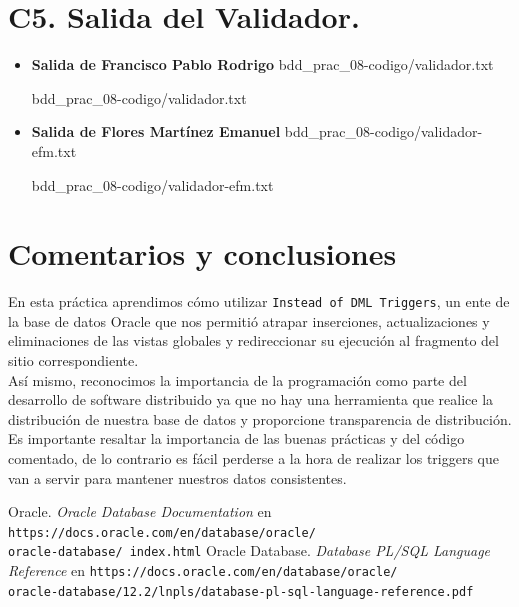 \documentclass{article}
\newcommand{\codedir}{bdd_prac_08-codigo}
\begin{document}
\section*{C5. Salida del Validador.}

\begin{itemize}
  \item \textbf{Salida de Francisco Pablo Rodrigo}
     {\codedir/validador.txt}
    
    {\codedir/validador.txt}

  \item \textbf{Salida de Flores Martínez Emanuel}
     {\codedir/validador-efm.txt}
    
    {\codedir/validador-efm.txt}
\end{itemize}

\newpage
\section*{Comentarios y conclusiones}

En esta práctica aprendimos cómo utilizar \texttt{Instead of DML Triggers},
un ente de la base de datos Oracle que nos permitió atrapar inserciones,
actualizaciones y eliminaciones de las vistas globales y redireccionar su
ejecución al fragmento del sitio correspondiente.\\

Así mismo, reconocimos la importancia de la programación como parte del
desarrollo de software distribuido ya que no hay una herramienta que realice la
distribución de nuestra base de datos y proporcione transparencia de
distribución. Es importante resaltar la importancia de las buenas prácticas y
del código comentado, de lo contrario es fácil perderse a la hora de realizar
los triggers que van a servir para mantener nuestros datos consistentes.

\renewcommand\refname{Bibliografía}
\begin{thebibliography}{99}
     Oracle. \textit{Oracle Database Documentation} en 
        \texttt{https://docs.oracle.com/en/database/oracle/\\oracle-database/%
        index.html}
     Oracle Database. \textit{Database PL/SQL Language 
        Reference} en 
        \texttt{https://docs.oracle.com/en/database/oracle/\\
        oracle-database/12.2/lnpls/database-pl-sql-language-reference.pdf}
\end{thebibliography}
\end{document}
